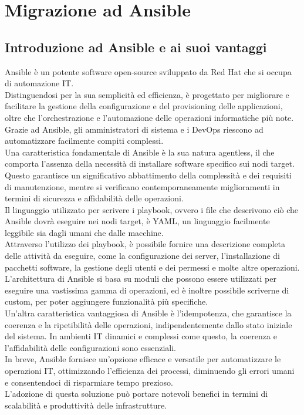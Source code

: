\chapter{Migrazione ad Ansible}
\label{cha:migrazione}

\section{Introduzione ad Ansible e ai suoi vantaggi}
\label{sec:ansible}

Ansible è un potente software open-source sviluppato da Red Hat che si occupa di
automazione IT.\\ Distinguendosi per la sua semplicità ed efficienza, è
progettato per migliorare e facilitare la gestione della configurazione e del
provisioning delle applicazioni, oltre che l'orchestrazione e l'automazione delle
operazioni informatiche più note.\\ Grazie ad Ansible, gli amministratori di
sistema e i DevOps riescono ad automatizzare facilmente compiti complessi.\\ Una
caratteristica fondamentale di Ansible è la sua natura agentless, il che comporta
l'assenza della necessità di installare software specifico sui nodi target.
Questo garantisce un significativo abbattimento della complessità e dei
requisiti di manutenzione, mentre si verificano contemporaneamente miglioramenti
in termini di sicurezza e affidabilità delle operazioni.\\ Il linguaggio utilizzato
per scrivere i playbook, ovvero i file che descrivono ciò che Ansible dovrà
eseguire nei nodi target, è YAML, un linguaggio facilmente leggibile sia dagli
umani che dalle macchine.\\ Attraverso l'utilizzo dei playbook, è possibile fornire
una descrizione completa delle attività da eseguire, come la configurazione dei
server, l'installazione di pacchetti software, la gestione degli utenti e dei
permessi e molte altre operazioni.\\ L'architettura di Ansible si basa su moduli
che possono essere utilizzati per eseguire una vastissima gamma di operazioni, ed
è inoltre possibile scriverne di custom, per poter aggiungere funzionalità più
specifiche.\\ Un'altra caratteristica vantaggiosa di Ansible è l'idempotenza, che
garantisce la coerenza e la ripetibilità delle operazioni, indipendentemente
dallo stato iniziale del sistema. In ambienti IT dinamici e complessi come questo,
la coerenza e l'affidabilità delle configurazioni sono essenziali.\\ In breve, Ansible
fornisce un'opzione efficace e versatile per automatizzare le operazioni IT,
ottimizzando l'efficienza dei processi, diminuendo gli errori umani e consentendoci
di risparmiare tempo prezioso.\\ L'adozione di questa soluzione può portare notevoli
benefici in termini di scalabilità e produttività delle infrastrutture.

